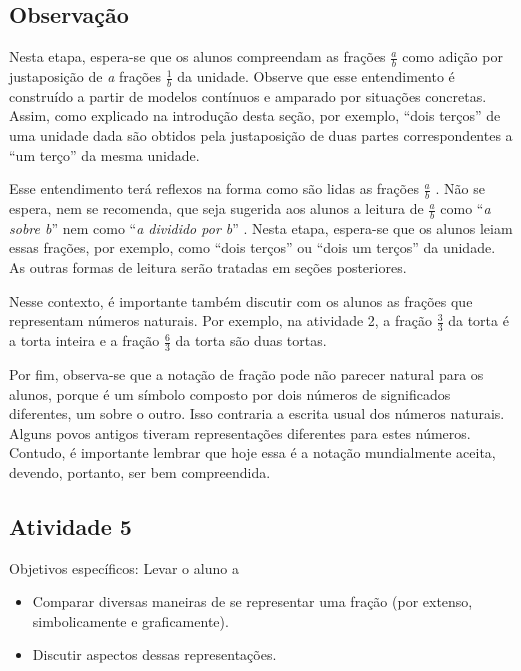 \documentclass[oneside]{book}
\begin{document}
\begin{multicols}{2}
\section*{Observação}



  Nesta etapa, espera-se que os alunos compreendam as frações   $\frac{a}{b}$   como adição por justaposição de   {\it a}   frações   $\frac{1}{b}$   da unidade. Observe que esse entendimento é construído a partir de modelos contínuos e amparado por situações concretas. Assim, como explicado na introdução desta seção, por exemplo,   ``dois terços''   de uma unidade dada são obtidos pela justaposição de duas partes correspondentes a   ``um terço''   da mesma unidade.

  Esse entendimento terá reflexos na forma como são lidas as frações   $\frac{a}{b}$  . Não se espera, nem se recomenda, que seja sugerida aos alunos a leitura de   $\frac{a}{b}$   como   ``{\it a sobre b}''   nem como   ``{\it a dividido por b}''  . Nesta etapa, espera-se que os alunos leiam essas frações, por exemplo, como   ``dois terços''   ou   ``dois um terços''   da unidade. As outras formas de leitura serão tratadas em seções posteriores.

  Nesse contexto, é importante também discutir com os alunos as frações que representam números naturais. Por exemplo, na atividade 2, a fração   $\frac{3}{3}$   da torta é a torta inteira e a fração   $\frac{6}{3}$   da torta são duas tortas.

  Por fim, observa-se que a notação de fração pode não parecer natural para os alunos, porque é um símbolo composto por dois números de significados diferentes, um sobre o outro. Isso contraria a escrita usual dos números naturais. Alguns povos antigos tiveram representações diferentes para estes números.  Contudo, é importante lembrar que hoje essa é a notação mundialmente aceita, devendo, portanto, ser bem compreendida.



\subsection{Atividade 5}





  Objetivos específicos: Levar o aluno a
\begin{itemize} %
    \item       Comparar diversas maneiras de se representar uma fração (por extenso, simbolicamente e graficamente).
    \item       Discutir aspectos dessas representações.
\end{itemize} %



\end{multicols}
\end{document}
